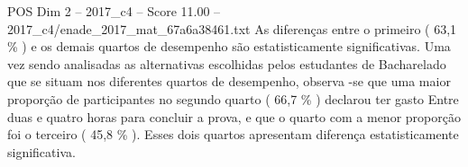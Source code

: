 \begin{textsample}{POS Dim 2 – 2017\_c4 – Score 11.00 – 2017\_c4/enade\_2017\_mat\_67a6a38461.txt}
As diferenças entre o primeiro ( 63,1 \% ) e os demais quartos de desempenho são estatisticamente significativas.
Uma vez sendo analisadas as alternativas escolhidas pelos estudantes de Bacharelado que se situam nos diferentes quartos de desempenho, observa -se que uma maior proporção de participantes no segundo quarto ( 66,7 \% ) declarou ter gasto Entre duas e quatro horas para concluir a prova, e que o quarto com a menor proporção foi o terceiro ( 45,8 \% ).
Esses dois quartos apresentam diferença estatisticamente significativa.

\end{textsample}
